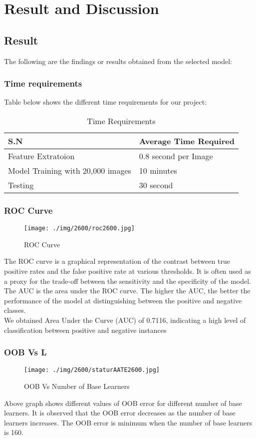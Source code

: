 \chapter{Result and Discussion}
\section{Result}
The following are the findings or results obtained from the selected model:
\subsection{Time requirements}
Table below shows the different time requirements for our project:
\begin{table}[H]
    \begin{tabular}{|l|l|}
    \hline
    S.N                & Average Time Required \\ \hline
    Feature Extratoion & 0.8 second per Image            \\ \hline
    Model Training with 20,000 images  & 10 minutes            \\ \hline
    Testing            & 30 second             \\ \hline
    \end{tabular}
    \caption{Time Requirements}
    \end{table}
\subsection{ROC Curve}
\begin{figure}[H]
    \centering
    \texttt{[image: ./img/2600/roc2600.jpg]}
    \caption{ROC Curve}
\end{figure}
The ROC curve is a graphical representation of the contrast between true positive rates and the false positive rate at various thresholds. It is often used as a proxy for the trade-off between the sensitivity and the specificity of the model. The AUC is the area under the ROC curve. The higher the AUC, the better the performance of the model at distinguishing between the positive and negative classes.\\
We obtained Area Under the Curve (AUC) of 0.7116, indicating a high level of classification between positive and negative instances
\subsection{OOB Vs L}
\begin{figure}[H]
    \centering
    \texttt{[image: ./img/2600/staturAATE2600.jpg]}
    \caption{OOB Vs Number of Base Learners}
\end{figure}
Above graph shows different values of OOB error for different number of base learners. It is observed that the OOB error decreases as the number of base learners increases. The OOB error is minimum when the number of base learners is 160.
